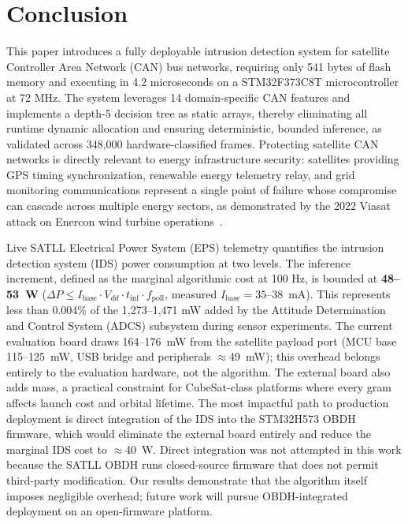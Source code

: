 \section{Conclusion}
\label{sec:conclusion}

This paper introduces a fully deployable intrusion detection system for satellite Controller Area Network (CAN) bus networks, requiring only 541 bytes of flash memory and executing in 4.2 microseconds on a STM32F373C8T microcontroller at 72 MHz. The system leverages 14 domain-specific CAN features and implements a depth-5 decision tree as static arrays, thereby eliminating all runtime dynamic allocation and ensuring deterministic, bounded inference, as validated across 348,000 hardware-classified frames. Protecting satellite CAN networks is directly relevant to energy infrastructure security: satellites providing GPS timing synchronization, renewable energy telemetry relay, and grid monitoring communications represent a single point of failure whose compromise can cascade across multiple energy sectors, as demonstrated by the 2022 Viasat attack on Enercon wind turbine operations~\cite{Viasat2022, SentinelOne2022}.

Live SATLL Electrical Power System (EPS) telemetry quantifies the intrusion detection system (IDS) power consumption at two levels. The inference increment, defined as the marginal algorithmic cost at 100 Hz, is bounded at \textbf{48--53~\textmu W} ($\Delta P \leq I_\text{base} \cdot V_{dd} \cdot t_\text{inf} \cdot f_\text{poll}$, measured $I_\text{base}=35$--$38$~mA). This represents less than 0.004\% of the 1,273–1,471 mW added by the Attitude Determination and Control System (ADCS) subsystem during sensor experiments. The current evaluation board draws 164--176~mW from the satellite payload port (MCU base 115--125~mW, USB bridge and peripherals $\approx$49~mW); this overhead belongs entirely to the evaluation hardware, not the algorithm. The external board also adds mass, a practical constraint for CubeSat-class platforms where every gram affects launch cost and orbital lifetime. The most impactful path to production deployment is direct integration of the IDS into the STM32H573 OBDH firmware, which would eliminate the external board entirely and reduce the marginal IDS cost to $\approx$40~\textmu W. Direct integration was not attempted in this work because the SATLL OBDH runs closed-source firmware that does not permit third-party modification. Our results demonstrate that the algorithm itself imposes negligible overhead; future work will pursue OBDH-integrated deployment on an open-firmware platform.

